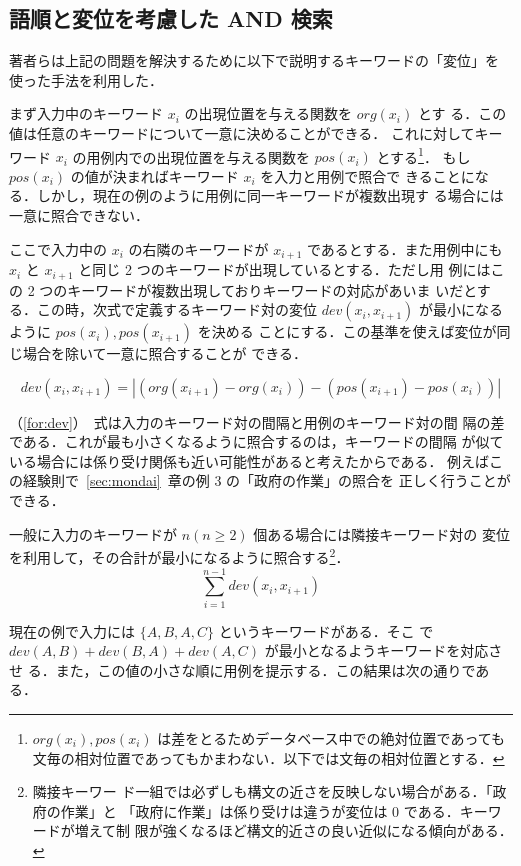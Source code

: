 \subsection{語順と変位を考慮した AND 検索}
\label{sec:teian}
著者らは上記の問題を解決するために以下で説明するキーワードの「変位」を
使った手法を利用した．

まず入力中のキーワード $x_i$ の出現位置を与える関数を $org(x_i)$ とす
る．この値は任意のキーワードについて一意に決めることができる．
これに対してキーワード $x_i$ の用例内での出現位置を与える関数を 
$pos(x_i)$ とする\footnote{$org(x_i), pos(x_i)$ は差をとるためデータベース中での絶対位置であっても文毎の相対位置であってもかまわない．以下では文毎の相対位置とする．}．
もし $pos(x_i)$ の値が決まればキーワード $x_i$ を入力と用例で照合で
きることになる．しかし，現在の例のように用例に同一キーワードが複数出現す
る場合には一意に照合できない．

ここで入力中の $x_i$ の右隣のキーワードが $x_{i+1}$ であるとする．また用例中にも $x_i$ と $x_{i+1}$ と同じ 2 つのキーワードが出現しているとする．ただし用
例にはこの 2 つのキーワードが複数出現しておりキーワードの対応があいま
いだとする．この時，次式で定義するキーワード対の変位 
$dev(x_i,x_{i+1})$ が最小になるように $pos(x_i),pos(x_{i+1})$ を決める
ことにする．この基準を使えば変位が同じ場合を除いて一意に照合することが
できる．

\begin{equation}
dev(x_i,x_{i+1}) = |(org(x_{i+1})-org(x_i))  - ( pos(x_{i+1})-pos(x_i))|
\label{for:dev}
\end{equation}

（\ref{for:dev}）~式は入力のキーワード対の間隔と用例のキーワード対の間
隔の差である．これが最も小さくなるように照合するのは，キーワードの間隔
が似ている場合には係り受け関係も近い可能性があると考えたからである．
例えばこの経験則で~\ref{sec:mondai}~章の例 3 の「政府の作業」の照合を
正しく行うことができる．

一般に入力のキーワードが $n(n \ge 2)$ 個ある場合には隣接キーワード対の
変位を利用して，その合計が最小になるように照合する\footnote{隣接キーワー
ド一組では必ずしも構文の近さを反映しない場合がある．「政府の作業」と
「政府に作業」は係り受けは違うが変位は 0 である．キーワードが増えて制
限が強くなるほど構文的近さの良い近似になる傾向がある．}．
\begin{equation}
 \sum_{i=1}^{n-1} dev(x_i, x_{i+1})
\end{equation}

現在の例で入力には $\{A,B,A,C\}$ というキーワードがある．そこ
で $dev(A, B)+dev(B,A)+dev(A,C)$ が最小となるようキーワードを対応させ
る．また，この値の小さな順に用例を提示する．この結果は次の通りである．

